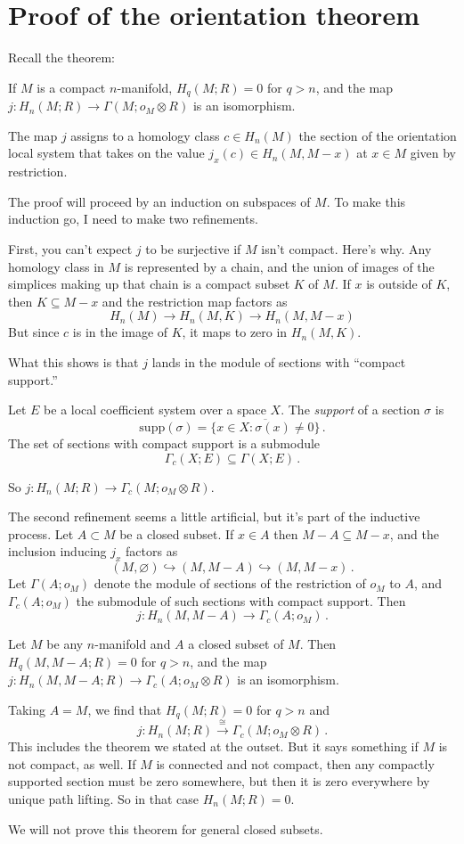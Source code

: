 \section{Proof of the orientation theorem}

Recall the theorem:

\begin{theorem}
If $M$ is a compact $n$-manifold, $H_q(M;R)=0$ for $q>n$, and
the map $j:H_n(M;R)\to\Gamma(M;o_M\otimes R)$ is an isomorphism. 
\end{theorem}

The map $j$ assigns to a homology class $c\in H_n(M)$ the section
of the orientation local system that takes on the value 
$j_x(c)\in H_n(M,M-x)$ at $x\in M$ given by restriction. 

The proof will proceed by an induction on subspaces of $M$. To make 
this induction go, I need to make two refinements. 

First, you can't expect $j$ to be surjective if $M$ isn't compact. 
Here's why. Any homology class in $M$ is represented by a chain, and
the union of images of the simplices making up that chain is a compact
subset $K$ of $M$. If $x$ is outside of $K$, then $K\subseteq M-x$ and
the restriction map factors as
\[
H_n(M)\to H_n(M,K)\to H_n(M,M-x)
\]
But since $c$ is in the image of $K$, it maps to zero in $H_n(M,K)$. 

What this shows is that $j$ lands in the module of sections with ``compact
support.''

\begin{definition} Let $E$ be a local coefficient system over a space $X$. 
The {\em support} of a section $\sigma$ is 
\[
\mathrm{supp}(\sigma)=\overline{\{x\in X:\sigma(x)\neq0\}}\,.
\]
The set of sections with compact support is a submodule 
\[
\Gamma_c(X;E)\subseteq\Gamma(X;E)\,.
\]
\end{definition}
So $j:H_n(M;R)\to\Gamma_c(M;o_M\otimes R)$.

The second refinement seems a little artificial, but it's part of the 
inductive process. Let $A\subset M$ be a closed subset. If $x\in A$
then $M-A\subseteq M-x$, and the inclusion inducing $j_x$ factors as
\[
(M,\varnothing)\hookrightarrow(M,M-A)\hookrightarrow(M,M-x)\,.
\]
Let $\Gamma(A;o_M)$ denote the module of sections of the restriction
of $o_M$ to $A$, and $\Gamma_c(A;o_M)$ the submodule of such sections
with compact support.  Then 
\[
j:H_n(M,M-A)\to\Gamma_c(A;o_M)\,.
\]
\begin{theorem} Let $M$ be any $n$-manifold and $A$ a closed subset of $M$.
Then $H_q(M,M-A;R)=0$ for $q>n$, and the map 
$j:H_n(M,M-A;R)\to\Gamma_c(A;o_M\otimes R)$ is an isomorphism.
\end{theorem}
Taking $A=M$, we find that $H_q(M;R)=0$ for $q>n$ and 
\[
j:H_n(M;R)\xrightarrow{\cong}\Gamma_c(M;o_M\otimes R)\,.
\]
This includes the theorem we stated at the outset. But it says something
if $M$ is not compact, as well. If $M$ is connected and not compact, then 
any compactly supported section must be zero somewhere, but then it is
zero everywhere by unique path lifting. So in that case $H_n(M;R)=0$. 

We will not prove this theorem for general closed subsets. 







